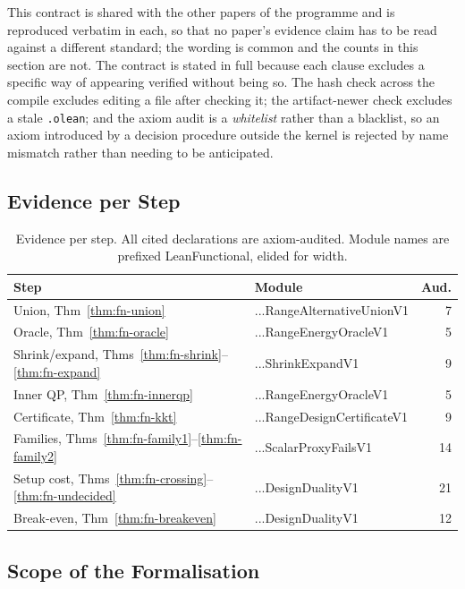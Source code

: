 \documentclass[conference]{IEEEtran}
\theoremstyle{definition}
\newcommand{\lean}[1]{\textsf{\footnotesize #1}}
\begin{document}
This contract is shared with the other papers of the programme and is reproduced verbatim in
each, so that no paper's evidence claim has to be read against a different standard; the
wording is common and the counts in this section are not. The contract is stated in full
because each clause excludes a specific way of appearing verified without being so. The hash check across the compile excludes editing a file after
checking it; the artifact-newer check excludes a stale \texttt{.olean}; and the axiom audit is
a \emph{whitelist} rather than a blacklist, so an axiom introduced by a decision procedure
outside the kernel is rejected by name mismatch rather than needing to be anticipated.

\subsection{Evidence per Step}

\begin{table}[htbp]
\caption{Evidence per step. All cited declarations are axiom-audited. Module names are
prefixed \lean{LeanFunctional}, elided for width.}
\label{tab:fn-inventory}
\centering\footnotesize\setlength{\tabcolsep}{3pt}
\begin{tabular}{@{}llr@{}}
\toprule
Step & Module & Aud. \\
\midrule
Union, Thm~\ref{thm:fn-union}              & \lean{...RangeAlternativeUnionV1}  &  7 \\
Oracle, Thm~\ref{thm:fn-oracle}            & \lean{...RangeEnergyOracleV1}      &  5 \\
Shrink/expand, Thms~\ref{thm:fn-shrink}--\ref{thm:fn-expand} & \lean{...ShrinkExpandV1} & 9 \\
Inner QP, Thm~\ref{thm:fn-innerqp}         & \lean{...RangeEnergyOracleV1}      &  5 \\
Certificate, Thm~\ref{thm:fn-kkt}          & \lean{...RangeDesignCertificateV1} &  9 \\
Families, Thms~\ref{thm:fn-family1}--\ref{thm:fn-family2} & \lean{...ScalarProxyFailsV1} & 14 \\
Setup cost, Thms~\ref{thm:fn-crossing}--\ref{thm:fn-undecided} & \lean{...DesignDualityV1} & 21 \\
Break-even, Thm~\ref{thm:fn-breakeven}     & \lean{...DesignDualityV1}          & 12 \\
\bottomrule
\end{tabular}
\end{table}

\subsection{Scope of the Formalisation}
\end{document}
